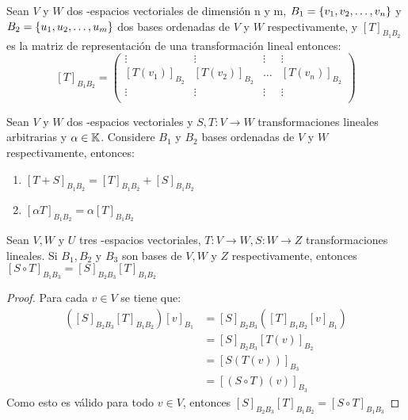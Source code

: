 \begin{theorem}
Sean $V$ y $W$ dos \dobleK-espacios vectoriales de dimensión n y m, $B_1= \lbrace v_1, v_2, \ldots, v_n \rbrace$  y $B_2= \lbrace u_1, u_2, \ldots, u_m \rbrace$  dos bases ordenadas de $V$ y $W$ respectivamente, y $[T]_{B_1 B_2}$ es la matriz de representación de una transformación lineal entonces:
\[[T]_{B_1 B_2}= \begin{pmatrix}
\vdots & \vdots & \vdots & \vdots\\
\left[T(v_1)\right]_{B_2}&\left[T(v_2)\right]_{B_2}& \hdots & \left[T(v_n)\right]_{B_2}\\
\vdots & \vdots & \vdots & \vdots\\
\end{pmatrix}\]
\end{theorem}

\newpage

\begin{theorem}
Sean $V$ y $W$ dos \dobleK-espacios vectoriales y $S, T : V \to W$ transformaciones lineales arbitrarias y $\alpha \in \mathbb{K}$. Considere $B_1$ y $B_2$ bases ordenadas de $V$ y $W$ respectivamente, entonces:
\begin{enumerate}
    \item $[T+S]_{B_1 B_2} = [T]_{B_1 B_2} + [S]_{B_1 B_2}$
    \item $[\alpha T]_{B_1 B_2} = \alpha [T]_{B_1 B_2}$
\end{enumerate}
\end{theorem}

\begin{theorem}
Sean $V,W$ y $U$ tres \dobleK-espacios vectoriales, $T: V \to W, S: W \to Z$ transformaciones lineales. Si $B_1, B_2$ y $B_3$ son bases de $V,W$ y $Z$ respectivamente, entonces $[S \circ T]_{B_1 B_3} = [S]_{B_2 B_3} [T]_{B_1 B_2}$
\end{theorem}
\begin{proof}
Para cada $v \in V$ se tiene que:
\begin{align*}
    ([S]_{B_2 B_3} [T]_{B_1 B_2})[v]_{B_1} &= [S]_{B_2 B_3}([T]_{B_1 B_2}[v]_{B_1})\\
    &= [S]_{B_2 B_3} [T(v)]_{B_2}\\
    &= [S(T(v))]_{B_3}\\
    &= [(S\circ T)(v)]_{B_3}
\end{align*}
Como esto es válido para todo $v \in V$, entonces $[S]_{B_2 B_3}[T]_{B_1 B_2} = [S \circ T]_{B_1 B_3}$
\end{proof}

